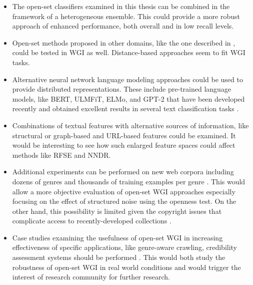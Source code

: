\begin{itemize}
    \item The open-set classifiers examined in this thesis can be combined in the framework of a heterogeneous ensemble. This could provide a more robust approach of enhanced performance, both overall and in low recall levels.
    \item Open-set methods proposed in other domains, like the one described in \parencite{fei2016breaking}, could be tested in WGI as well. Distance-based approaches seem to fit WGI tasks. 
    \item Alternative neural network language modeling approaches could be used to provide distributed representations. These include pre-trained language models, like BERT, ULMFiT, ELMo, and GPT-2 that have been developed recently and obtained excellent results in several text classification tasks \parencite{Devlin:2019,Howard:2018,Peters:2018,radford2019language}.
    \item Combinations of textual features with alternative sources of information, like structural or graph-based and URL-based features could be examined. It would be interesting to see how such enlarged feature spaces could affect methods like RFSE and NNDR.
    \item Additional experiments can be performed on new web corpora including dozens of genres and thousands of training examples per genre \parencite{Egbert:2015}. This would allow a more objective evaluation of open-set WGI approaches especially focusing on the effect of structured noise using the openness test. On the other hand, this possibility is limited given the copyright issues that complicate access to recently-developed collections \parencite{Asheghi2015}.
    \item Case studies examining the usefulness of open-set WGI in increasing effectiveness of specific applications, like genre-aware crawling, credibility assessment systems should be performed \parencite{deAssis:2017,Agrawal:2018}. This would both study the robustness of open-set WGI in real world conditions and would trigger the interest of research community for further research.
    
\end{itemize}

